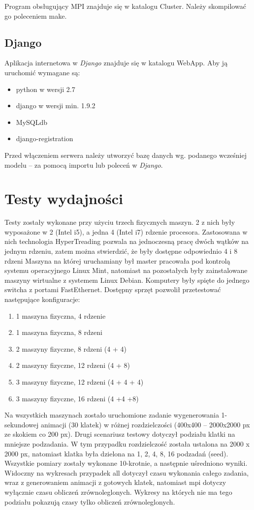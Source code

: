 \documentclass[a4paper]{article}
\begin{document}
Program obsługujący MPI znajduje się w katalogu Cluster. Należy skompilować go poleceniem make.

\subsection{Django}
Aplikacja internetowa w \textit{Django} znajduje się w katalogu WebApp. Aby ją uruchomić wymagane są:
\begin{itemize}
\item python w wersji 2.7
\item django w wersji min. 1.9.2
\item MySQLdb
\item django-registration
\end{itemize}
Przed włączeniem serwera należy utworzyć bazę danych wg. podanego wcześniej modelu -- za pomocą importu lub poleceń w \textit{Django}.\\

\newpage

\section{Testy wydajności}
Testy zostały wykonane przy użyciu trzech fizycznych maszyn. 2 z nich były wyposażone w 2 (Intel i5), a jedna 4 (Intel i7) rdzenie procesora. Zastosowana w nich technologia HyperTreading pozwala na jednoczesną pracę dwóch wątków na jednym rdzeniu, zatem można stwierdzić, że były dostępne odpowiednio 4 i 8 rdzeni Maszyna na której uruchamiany był master pracowała pod kontrolą systemu operacyjnego Linux Mint, natomiast na pozostałych były zainstalowane maszyny wirtualne z systemem Linux Debian. Komputery były spięte do jednego switcha z portami FastEthernet. Dostępny sprzęt pozwolił przetestować następujące konfiguracje:
\begin{enumerate}
\item 1 maszyna fizyczna, 4 rdzenie
\item 1 maszyna fizyczna, 8 rdzeni
\item 2 maszyny fizyczne, 8 rdzeni (4 + 4)
\item 2 maszyny fizyczne, 12 rdzeni (4 + 8)
\item 3 maszyny fizyczne, 12 rdzeni (4 + 4 + 4)
\item 3 maszyny fizyczne, 16 rdzeni (4 +4 +8)
\end{enumerate}

Na wszystkich maszynach zostało uruchomione zadanie wygenerowania 1-sekundowej animacji (30 klatek) w różnej rozdzielczości (400x400 – 2000x2000 px ze skokiem co 200 px). Drugi scenariusz testowy dotyczył podziału klatki na mniejsze podzadania. W tym przypadku rozdzielczość została ustalona na 2000 x 2000 px, natomiast klatka była dzielona na 1, 2, 4, 8, 16 podzadań (seed). Wszystkie pomiary zostały wykonane 10-krotnie, a następnie uśredniono wyniki. Widoczny na wykresach przypadek all dotyczył czasu wykonania całego zadania, wraz z generowaniem animacji z gotowych klatek, natomiast mpi dotyczy wyłącznie czasu obliczeń zrównoleglonych. Wykresy na których nie ma tego podziału pokazują czasy tylko obliczeń zrównoleglonych.
\end{document}
